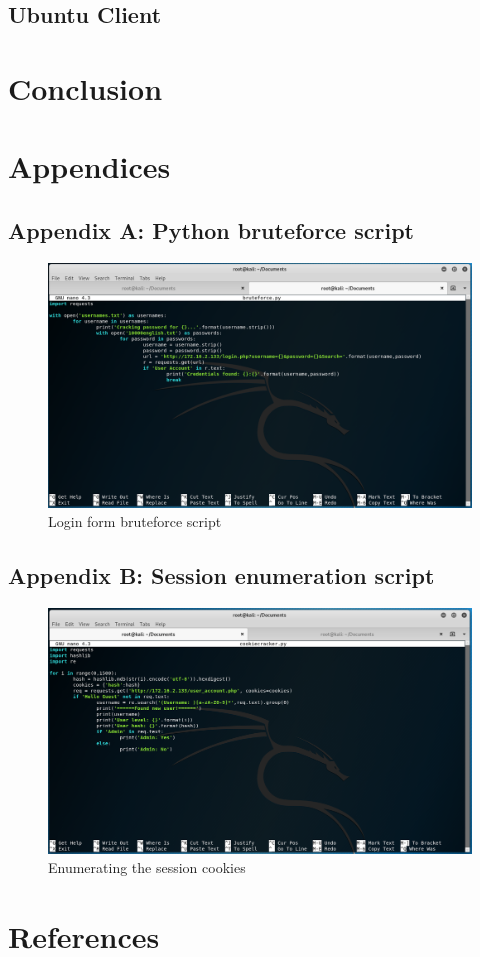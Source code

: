 \documentclass{report}
\begin{document}
\section{Ubuntu Client}

\chapter{Conclusion}

\chapter{Appendices}
\section{Appendix A: Python bruteforce script}
\begin{figure}[!htb]
	\centering
	\includegraphics[scale=0.4]{img/bruteforcescript.png}
	\caption{Login form bruteforce script}
\end{figure}
\section{Appendix B: Session enumeration script}
\begin{figure}[!htb]
	\centering
	\includegraphics[scale=0.4]{img/cookiescript.png}
	\caption{Enumerating the session cookies}
\end{figure}

\chapter{References}
\end{document}

